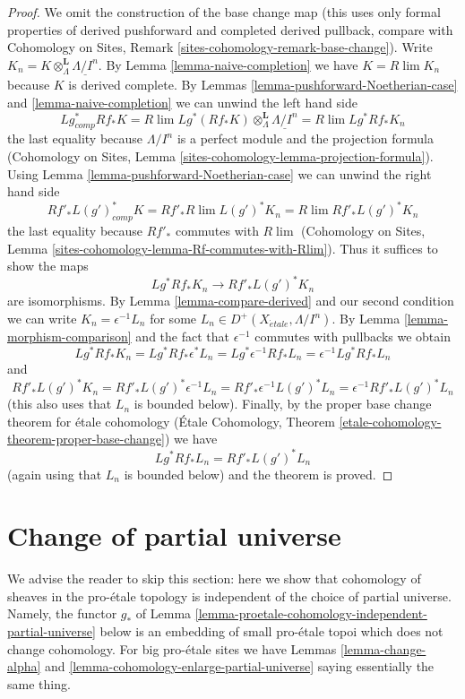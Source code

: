 \documentclass{stacks-project}
\theoremstyle{plain}
\theoremstyle{definition}
\theoremstyle{remark}
\numberwithin{equation}{subsection}
\def\lim{\mathop{\mathrm{lim}}\nolimits}
\def\etale{{\acute{e}tale}}
\begin{document}
\begin{proof}
We omit the construction of the base change map (this uses only
formal properties of derived pushforward and completed derived pullback,
compare with
Cohomology on Sites, Remark \ref{sites-cohomology-remark-base-change}).
Write $K_n = K \otimes^\mathbf{L}_\Lambda \underline{\Lambda/I^n}$.
By Lemma \ref{lemma-naive-completion} we have $K = R\lim K_n$
because $K$ is derived complete.
By Lemmas \ref{lemma-pushforward-Noetherian-case} and
\ref{lemma-naive-completion} we can unwind the left hand side
$$
Lg_{comp}^* Rf_* K =
R\lim Lg^*(Rf_*K)\otimes^\mathbf{L}_\Lambda \underline{\Lambda/I^n} =
R\lim Lg^* Rf_* K_n
$$
the last equality because $\Lambda/I^n$ is a perfect module and
the projection formula (Cohomology on Sites, Lemma
\ref{sites-cohomology-lemma-projection-formula}).
Using Lemma \ref{lemma-pushforward-Noetherian-case} we can unwind the right
hand side
$$
Rf'_* L(g')^*_{comp} K =
Rf'_* R\lim L(g')^* K_n  =
R\lim Rf'_* L(g')^* K_n
$$
the last equality because $Rf'_*$ commutes with $R\lim$
(Cohomology on Sites, Lemma
\ref{sites-cohomology-lemma-Rf-commutes-with-Rlim}).
Thus it suffices to show the maps
$$
Lg^* Rf_* K_n \longrightarrow Rf'_* L(g')^* K_n
$$
are isomorphisms. By Lemma \ref{lemma-compare-derived} and our second
condition we can write $K_n = \epsilon^{-1}L_n$ for some
$L_n \in D^+(X_\etale, \Lambda/I^n)$. By Lemma \ref{lemma-morphism-comparison}
and the fact that $\epsilon^{-1}$ commutes with pullbacks
we obtain
$$
Lg^* Rf_* K_n =
Lg^* Rf_* \epsilon^*L_n =
Lg^* \epsilon^{-1} Rf_* L_n =
\epsilon^{-1} Lg^* Rf_* L_n
$$
and
$$
Rf'_* L(g')^* K_n =
Rf'_* L(g')^* \epsilon^{-1} L_n =
Rf'_* \epsilon^{-1} L(g')^* L_n =
\epsilon^{-1} Rf'_* L(g')^* L_n
$$
(this also uses that $L_n$ is bounded below).
Finally, by the proper base change theorem for \'etale cohomology
(\'Etale Cohomology, Theorem
\ref{etale-cohomology-theorem-proper-base-change}) we have
$$
Lg^* Rf_* L_n = Rf'_* L(g')^* L_n
$$
(again using that $L_n$ is bounded below)
and the theorem is proved.
\end{proof}






\section{Change of partial universe}
\label{section-change-universe}

\noindent
We advise the reader to skip this section: here we show that cohomology
of sheaves in the pro-\'etale topology is independent of the
choice of partial universe. Namely, the functor $g_*$ of
Lemma \ref{lemma-proetale-cohomology-independent-partial-universe} below
is an embedding of small pro-\'etale topoi which does not change cohomology.
For big pro-\'etale sites we have Lemmas \ref{lemma-change-alpha} and
\ref{lemma-cohomology-enlarge-partial-universe} saying essentially the
same thing.
\end{document}

